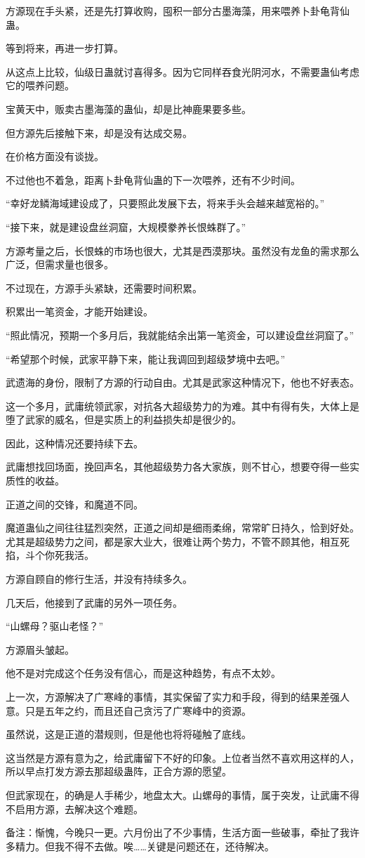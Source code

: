 \begin{this_body}
方源现在手头紧，还是先打算收购，囤积一部分古墨海藻，用来喂养卜卦龟背仙蛊。

等到将来，再进一步打算。

从这点上比较，仙级日蛊就讨喜得多。因为它同样吞食光阴河水，不需要蛊仙考虑它的喂养问题。

宝黄天中，贩卖古墨海藻的蛊仙，却是比神鹿果要多些。

但方源先后接触下来，却是没有达成交易。

在价格方面没有谈拢。

不过他也不着急，距离卜卦龟背仙蛊的下一次喂养，还有不少时间。

“幸好龙鳞海域建设成了，只要照此发展下去，将来手头会越来越宽裕的。”

“接下来，就是建设盘丝洞窟，大规模豢养长恨蛛群了。”

方源考量之后，长恨蛛的市场也很大，尤其是西漠那块。虽然没有龙鱼的需求那么广泛，但需求量也很多。

不过现在，方源手头紧缺，还需要时间积累。

积累出一笔资金，才能开始建设。

“照此情况，预期一个多月后，我就能结余出第一笔资金，可以建设盘丝洞窟了。”

“希望那个时候，武家平静下来，能让我调回到超级梦境中去吧。”

武遗海的身份，限制了方源的行动自由。尤其是武家这种情况下，他也不好表态。

这一个多月，武庸统领武家，对抗各大超级势力的为难。其中有得有失，大体上是堕了武家的威名，但是实质上的利益损失却是很少的。

因此，这种情况还要持续下去。

武庸想找回场面，挽回声名，其他超级势力各大家族，则不甘心，想要夺得一些实质性的收益。

正道之间的交锋，和魔道不同。

魔道蛊仙之间往往猛烈突然，正道之间却是细雨柔绵，常常旷日持久，恰到好处。尤其是超级势力之间，都是家大业大，很难让两个势力，不管不顾其他，相互死掐，斗个你死我活。

方源自顾自的修行生活，并没有持续多久。

几天后，他接到了武庸的另外一项任务。

“山螺母？驱山老怪？”

方源眉头皱起。

他不是对完成这个任务没有信心，而是这种趋势，有点不太妙。

上一次，方源解决了广寒峰的事情，其实保留了实力和手段，得到的结果差强人意。只是五年之约，而且还自己贪污了广寒峰中的资源。

虽然说，这是正道的潜规则，但是他也将将碰触了底线。

这当然是方源有意为之，给武庸留下不好的印象。上位者当然不喜欢用这样的人，所以早点打发方源去那超级蛊阵，正合方源的愿望。

但武家现在，的确是人手稀少，地盘太大。山螺母的事情，属于突发，让武庸不得不启用方源，去解决这个难题。

备注：惭愧，今晚只一更。六月份出了不少事情，生活方面一些破事，牵扯了我许多精力。但我不得不去做。唉……关键是问题还在，还待解决。

\end{this_body}

